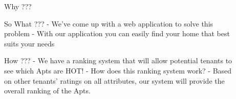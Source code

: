 \documentclass[final]{beamer}
\newlength{\sepwid}
\newlength{\onecolwid}
\newlength{\twocolwid}
\begin{document}
\begin{frame}[t]
\begin{columns}[t]
\begin{column}{\onecolwid}
\begin{block}{Why ???}
\end{block}


%
%
\begin{block}{So What ???}
- We've come up with a web application to solve this problem\newline
- With our application you can easily find your home that best suits your needs\newline

\end{block}
\begin{block}{How ???}
- We have a ranking system that will allow potential tenants to see which Apts are HOT!\newline
- How does this ranking system work?\newline
- Based on other tenants' ratings on all attributes, our system will provide the overall ranking of the Apts.\newline\newline

\end{block}


\end{column} %

\begin{column}{\sepwid}\end{column} %

\begin{column}{\twocolwid} %

\begin{columns}[t,totalwidth=\twocolwid] %

\begin{column}{\onecolwid} %




\end{column} %

\begin{column}{\onecolwid} %


\end{column}
\end{columns}
\end{column}
\end{columns}
\end{frame}
\end{document}
